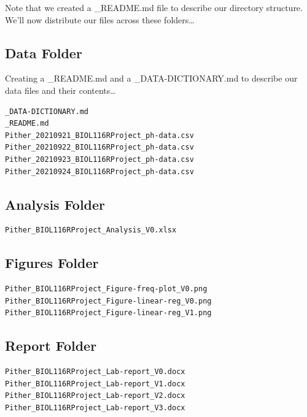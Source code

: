 \documentclass[
]{book}
\begin{document}
Note that we created a \_README.md file to describe our directory structure. We'll now distribute our files across these folders\ldots{}

\hypertarget{data-folder}{%
\subsection*{Data Folder}\label{data-folder}}

Creating a \_README.md and a \_DATA-DICTIONARY.md to describe our data files and their contents\ldots{}

\begin{verbatim}
_DATA-DICTIONARY.md
_README.md
Pither_20210921_BIOL116RProject_ph-data.csv
Pither_20210922_BIOL116RProject_ph-data.csv
Pither_20210923_BIOL116RProject_ph-data.csv
Pither_20210924_BIOL116RProject_ph-data.csv
\end{verbatim}

\hypertarget{analysis-folder}{%
\subsection*{Analysis Folder}\label{analysis-folder}}

\begin{verbatim}
Pither_BIOL116RProject_Analysis_V0.xlsx
\end{verbatim}

\hypertarget{figures-folder}{%
\subsection*{Figures Folder}\label{figures-folder}}

\begin{verbatim}
Pither_BIOL116RProject_Figure-freq-plot_V0.png
Pither_BIOL116RProject_Figure-linear-reg_V0.png
Pither_BIOL116RProject_Figure-linear-reg_V1.png
\end{verbatim}

\hypertarget{report-folder}{%
\subsection*{Report Folder}\label{report-folder}}

\begin{verbatim}
Pither_BIOL116RProject_Lab-report_V0.docx
Pither_BIOL116RProject_Lab-report_V1.docx
Pither_BIOL116RProject_Lab-report_V2.docx
Pither_BIOL116RProject_Lab-report_V3.docx
\end{verbatim}
\end{document}
